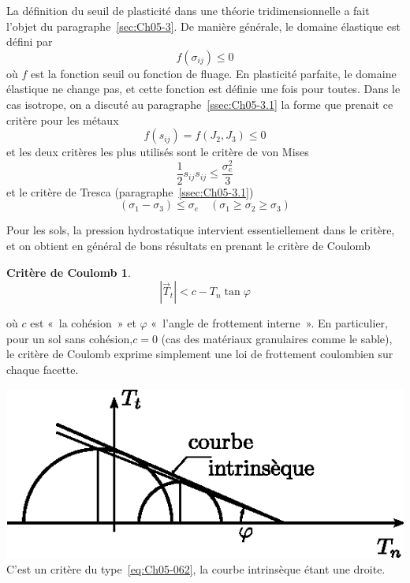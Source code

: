 La définition du seuil de plasticité dans une théorie tridimensionnelle a fait l'objet du paragraphe~\ref{sec:Ch05-3}.
De manière générale, le domaine élastique est défini par 
\begin{equation}
    f\left( \sigma_{ij} \right) \leq 0
    \label{eq:Ch10-009}
\end{equation}
où $f$ est la fonction seuil ou fonction de fluage.
En plasticité parfaite, le domaine élastique ne change pas, et cette fonction est définie une fois pour toutes.
Dans le cas isotrope, on a discuté au paragraphe~\ref{ssec:Ch05-3.1} la forme que prenait ce critère pour les métaux 
\begin{equation}
    f\left( s_{ij} \right) = f\left( J_2,J_3 \right) \leq 0
    \label{eq:Ch10-010}
\end{equation}
et les deux critères les plus utilisés sont le critère de von Mises 
\begin{equation}
    \frac{1}{2} s_{ij} s_{ij} \leq \frac{\sigma_e^2}{3}
    \label{eq:Ch10-011}
\end{equation}
et le critère de Tresca (paragraphe~\ref{ssec:Ch05-3.1}) 
\begin{equation}
    \left( \sigma_1 - \sigma_3 \right) \leq \sigma_e \quad \left( \sigma_1 \geq \sigma_2 \geq \sigma_3 \right)
    \label{eq:Ch10-012}
\end{equation}

Pour les sols, la pression hydrostatique intervient essentiellement dans le critère, et on obtient en général de bons résultats en prenant le critère de Coulomb 
\newtheorem*{ccoulomb}{Critère de Coulomb}
\begin{ccoulomb}
    \begin{equation}
        |\vec{T}_t| < c - T_n \tan \varphi
        \label{eq:Ch10-013}
    \end{equation}
\end{ccoulomb}
où $c$ est «~la cohésion~» et $\varphi$ «~l'angle de frottement interne~».
En particulier, pour un sol sans cohésion,$ c = 0$ (cas des matériaux granulaires comme le sable), le critère de Coulomb exprime simplement une loi de frottement coulombien sur chaque facette. 
\begin{multicols}{2}
    \centering
    \includegraphics{../images/T1_Ch10-07}
    \columnbreak
    C'est un critère du type~\eqref{eq:Ch05-062}, la courbe intrinsèque étant une droite. 
\end{multicols}

